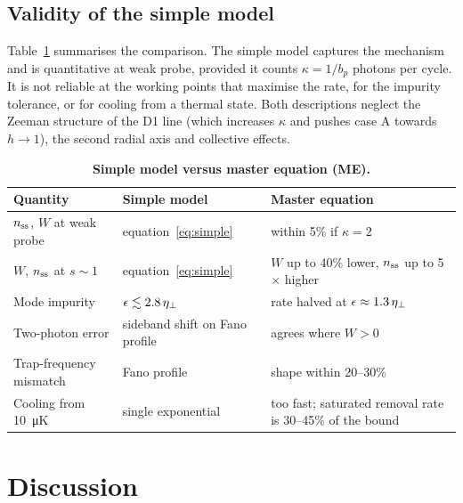 \documentclass[10pt,twocolumn,a4paper]{article}
\begin{document}
\subsection{Validity of the simple model}
Table~\ref{tab:validity} summarises the comparison. The simple model captures the mechanism and is quantitative at weak probe, provided it counts $\kappa=1/b_p$ photons per cycle. It is not reliable at the working points that maximise the rate, for the impurity tolerance, or for cooling from a thermal state. Both descriptions neglect the Zeeman structure of the D1 line (which increases $\kappa$ and pushes case A towards $h\to1$), the second radial axis and collective effects.

\begin{table}[t]
\caption{\textbf{Simple model versus master equation (ME).}}
\label{tab:validity}
\centering\footnotesize\sffamily
\begin{tabular}{@{}p{4.0cm}p{5.0cm}p{7.6cm}@{}}
\toprule
Quantity & Simple model & Master equation\\
\midrule
$n_{\rm ss}$, $W$ at weak probe & equation~\eqref{eq:simple} & within 5\% if $\kappa=2$\\
$W$, $n_{\rm ss}$ at $s\sim1$ & equation~\eqref{eq:simple} & $W$ up to 40\% lower, $n_{\rm ss}$ up to 5$\times$ higher\\
Mode impurity & $\epsilon\lesssim2.8\,\eta_{\perp}$ & rate halved at $\epsilon\approx1.3\,\eta_{\perp}$\\
Two-photon error & sideband shift on Fano profile & agrees where $W>0$\\
Trap-frequency mismatch & Fano profile & shape within 20--30\%\\
Cooling from \SI{10}{\micro K} & single exponential & too fast; saturated removal rate is 30--45\% of the bound\\
\bottomrule
\end{tabular}
\end{table}

\section{Discussion}
\end{document}
